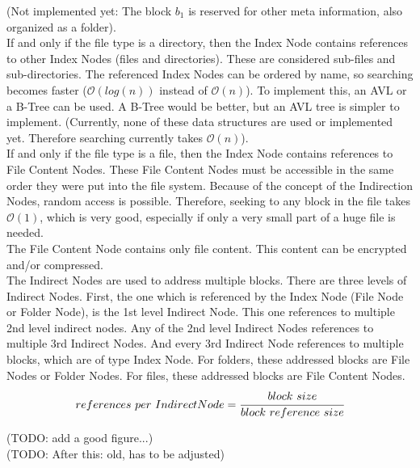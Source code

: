 \documentclass[JCDReport.tex]{subfiles}
\begin{document}
(Not implemented yet: The block $b_{1}$ is reserved for other meta information, also organized as a folder).\\

If and only if the file type is a directory, then the Index Node contains references to other Index Nodes (files and directories). These are considered sub-files and sub-directories. The referenced Index Nodes can be ordered by name, so searching becomes faster ($\mathcal{O}(log(n))$ instead of $\mathcal{O}(n)$). To implement this, an AVL or a B-Tree can be used. A B-Tree would be better, but an AVL tree is simpler to implement. (Currently, none of these data structures are used or implemented yet. Therefore searching currently takes $\mathcal{O}(n)$).\\

If and only if the file type is a file, then the Index Node contains references to File Content Nodes. These File Content Nodes must be accessible in the same order they were put into the file system. Because of the concept of the Indirection Nodes, random access is possible. Therefore, seeking to any block in the file takes $\mathcal{O}(1)$, which is very good, especially if only a very small part of a huge file is needed.\\

The File Content Node contains only file content. This content can be encrypted and/or compressed.\\

The Indirect Nodes are used to address multiple blocks. There are three levels of Indirect Nodes. First, the one which is referenced by the Index Node (File Node or Folder Node), is the 1st level Indirect Node. This one references to multiple 2nd level indirect nodes. Any of the 2nd level Indirect Nodes references to multiple 3rd Indirect Nodes. And every 3rd Indirect Node references to multiple blocks, which are of type Index Node. For folders, these addressed blocks are File Nodes or Folder Nodes. For files, these addressed blocks are File Content Nodes.\\

$$references\ per\ Indirect Node = \cfrac{block\ size}{block\ reference\ size}$$



(TODO: add a good figure...)\\

(TODO: After this: old, has to be adjusted)\\
\\
\end{document}
